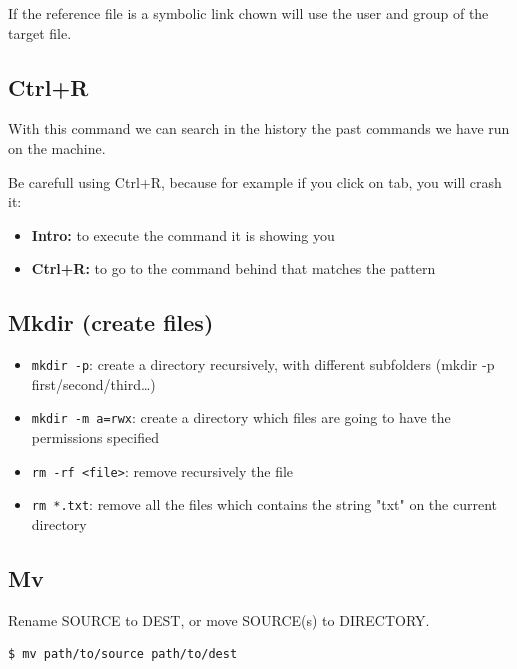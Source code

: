 \documentclass{article}
\newenvironment{blocktemplateIII}[1]{%
    \tcolorbox[beamer,%
    noparskip,breakable,
    ,colframe=Red,%
    colbacklower=LimeGreen!75!LightGreen,%
    title=#1]}%
    {\endtcolorbox}
\newenvironment{codetemplate}[1][]{%
  \mybasecolorbox[#1]
  \itshape
}{%
  \endmybasecolorbox
}
\begin{document}
\begin{blocktemplateIII}{WARNING}
If the reference file is a symbolic link chown will use the user and group of the target file.
\end{blocktemplateIII}

\subsection{Ctrl+R}

With this command we can search in the history the past commands we have run on the machine.

Be carefull using Ctrl+R, because for example if you click on tab, you will crash it:

\begin{itemize}
    \item \textbf{Intro:} to execute the command it is showing you
    \item \textbf{Ctrl+R:} to go to the command behind that matches the pattern
\end{itemize}

\subsection{Mkdir (create files)}
\begin{itemize}
    \item \verb+mkdir -p+: create a directory recursively, with different subfolders (mkdir -p first/second/third…)
    \item \verb+mkdir -m a=rwx+: create a directory which files are going to have the permissions specified
    \item \verb+rm -rf <file>+: remove recursively the file
    \item \verb+rm *.txt+: remove all the files which contains the string "txt" on the current directory
\end{itemize}

\subsection{Mv}
Rename SOURCE to DEST, or move SOURCE(s) to DIRECTORY.
\begin{codetemplate}{}
\begin{verbatim}
$ mv path/to/source path/to/dest
\end{verbatim}
\end{codetemplate}
\end{document}
